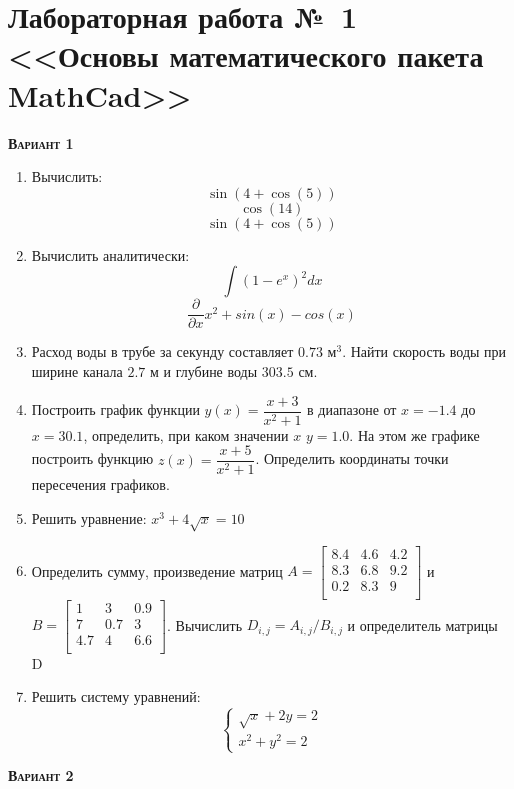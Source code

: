 \section{{Лабораторная работа №~1 <<Основы математического пакета MathCad>>}}

 \addtocounter{nlab}{1}\textsc{\textbf{Вариант 1}}

\begin{enumerate}
\item Вычислить: 
\begin{equation*}\sin(4+\cos(5))                   \end{equation*}
\begin{equation*}\cos(14)                          \end{equation*}
\begin{equation*}\sin(4+\cos(5))                   \end{equation*}

\item Вычислить аналитически: 
 \begin{equation*} \int (1-e^x)^2 dx          \end{equation*}\begin{equation*} {\dfrac{\partial} {\partial x} x^2 +sin(x) -cos(x)} \end{equation*}


\item Расход воды в трубе за секунду составляет $0.73$ $\text{м}^3$. Найти скорость воды при ширине канала $2.7$ м и глубине воды $303.5$ см.

\item Построить график функции $y(x)=\dfrac{x+3}{x^2+1}    $ в диапазоне от $x=-1.4$ до $x=30.1$, определить, при каком значении $x$ $y=1.0$. На этом же графике построить функцию $z(x)=\dfrac{x+5}{x^2+1}        $. Определить координаты точки пересечения графиков. \item Решить уравнение: $x^3+4 \sqrt{x}=10    $

\item Определить сумму, произведение матриц $A=\begin{bmatrix}
8.4 &4.6 &4.2 \\
8.3 &6.8 &9.2 \\
0.2 &8.3 &9 \\
\end{bmatrix}
$ и $B=\begin{bmatrix}
1 &3 &0.9 \\
7 &0.7 &3 \\
4.7 &4 &6.6 \\
\end{bmatrix}
$. Вычислить $D_{i,j}=A_{i,j}  /  B_{i,j}$ и определитель матрицы D

\item Решить систему уравнений: \begin{equation*} \begin{cases} \sqrt{x}+2y=2        \\ x^2+y^2=2                 \end{cases} \end{equation*} 

\end{enumerate}
\textsc{\textbf{Вариант 2}}

